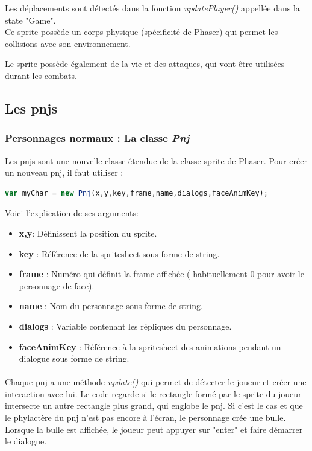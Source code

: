 \documentclass[11pt]{article}
\begin{document}
\begin{appendices}
Les déplacements sont détectés dans la fonction \textit{updatePlayer()} appellée dans la state "Game".\\


Ce sprite possède un corps physique (spécificité de Phaser) qui permet les collisions avec son environnement.


Le sprite possède également de la vie et des attaques, qui vont être utilisées durant les combats. 
\subsection{Les pnjs}
\subsubsection{Personnages normaux : La classe \textit{Pnj}}
Les pnjs sont une nouvelle classe étendue de la classe sprite de Phaser. Pour créer un nouveau pnj, il faut utiliser :\\
 \begin{lstlisting}[language=JavaScript]
var myChar = new Pnj(x,y,key,frame,name,dialogs,faceAnimKey);
\end{lstlisting}
Voici l'explication de ses arguments:
\begin{itemize}
\item \textbf{x,y}: Définissent la position du sprite.
\item \textbf{key} : Référence de la spritesheet sous forme de string.
\item \textbf{frame} : Numéro qui définit la frame affichée ( habituellement 0 pour avoir le personnage de face).
\item \textbf{name} : Nom du personnage sous forme de string.
\item \textbf{dialogs} : Variable contenant les répliques du personnage.
\item \textbf{faceAnimKey} : Référence à la spritesheet des animations pendant un dialogue sous forme de string.
\end{itemize}
\paragraph{}

Chaque pnj a une méthode \textit{update()} qui permet de détecter le joueur et créer une interaction avec lui. Le code regarde si le rectangle formé par le sprite du joueur intersecte un autre rectangle plus grand, qui englobe le pnj. Si c'est le cas et que le phylactère du pnj n'est pas encore à l'écran, le personnage crée une bulle. Lorsque la bulle est affichée, le joueur peut appuyer sur "enter" et faire démarrer le dialogue.\\


\end{appendices}
\end{document}
